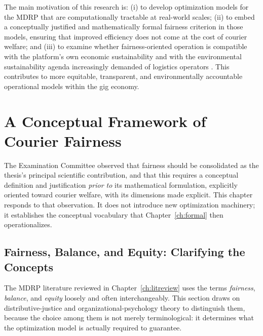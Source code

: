 \documentclass[12pt,a4paper]{report}
\begin{document}
The main motivation of this research is: (i) to develop optimization models
for the MDRP that are computationally tractable at real-world scales; (ii) to embed a conceptually justified and mathematically formal fairness criterion in those models, ensuring that improved efficiency does not come at the cost of courier welfare; and (iii) to examine whether fairness-oriented operation is compatible with the platform's own economic sustainability and with the environmental sustainability agenda increasingly demanded of logistics operators \citep{bajec2022strategic,liao2020multi}. This contributes to more equitable, transparent, and environmentally accountable operational models within the gig economy.

\chapter{A Conceptual Framework of Courier Fairness}
\label{ch:concept}

The Examination Committee observed that fairness should be consolidated as the thesis's principal scientific contribution, and that this requires a conceptual definition and justification \emph{prior to} its mathematical formulation, explicitly oriented toward courier welfare, with its dimensions made explicit. This chapter responds to that observation. It does not introduce new optimization machinery; it establishes the conceptual vocabulary that Chapter~\ref{ch:formal} then operationalizes.

\section{Fairness, Balance, and Equity: Clarifying the Concepts}
\label{sec:concept-define}

The MDRP literature reviewed in Chapter~\ref{ch:litreview} uses the terms \emph{fairness}, \emph{balance}, and \emph{equity} loosely and often interchangeably. This section draws on distributive-justice and organizational-psychology theory to distinguish them, because the choice among them is not merely terminological: it determines what the optimization model is actually required to guarantee.
\end{document}

